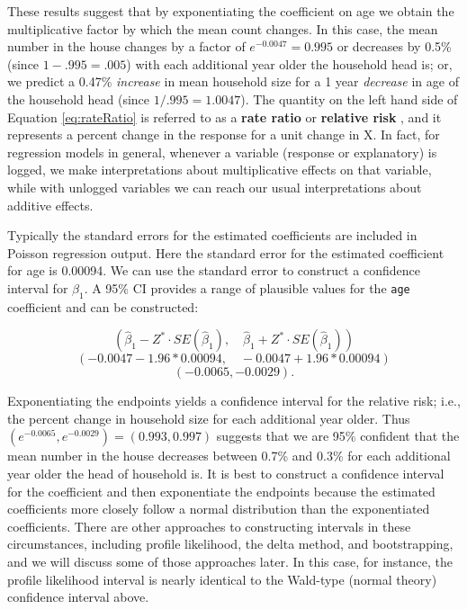 \documentclass[
]{krantz}
\begin{document}
These results suggest that by exponentiating the coefficient on age we obtain the multiplicative factor by which the mean count changes. In this case, the mean number in the house changes by a factor of \(e^{-0.0047}=0.995\) or decreases by 0.5\% (since \(1-.995 = .005\)) with each additional year older the household head is; or, we predict a 0.47\% \emph{increase} in mean household size for a 1 year \emph{decrease} in age of the household head (since \(1/.995=1.0047\)). The quantity on the left hand side of Equation \eqref{eq:rateRatio} is referred to as a \textbf{rate ratio} or \textbf{relative risk} , and it represents a percent change in the response for a unit change in X. In fact, for regression models in general, whenever a variable (response or explanatory) is logged, we make interpretations about multiplicative effects on that variable, while with unlogged variables we can reach our usual interpretations about additive effects.

Typically the standard errors for the estimated coefficients are included in Poisson regression output. Here the standard error for the estimated coefficient for age is 0.00094. We can use the standard error to construct a confidence interval for \(\beta_1\). A 95\% CI provides a range of plausible values for the \texttt{age} coefficient and can be constructed:

\[(\hat\beta_1-Z^*\cdot SE(\hat\beta_1), \quad \hat\beta_1+Z^*\cdot SE(\hat\beta_1))\]
\[(-0.0047-1.96*0.00094, \quad -0.0047+1.96*0.00094)\]
\[ (-0.0065, -0.0029).
 \]

Exponentiating the endpoints yields a confidence interval for the relative risk; i.e., the percent change in household size for each additional year older. Thus \((e^{-0.0065},e^{-0.0029})=(0.993,0.997)\) suggests that we are 95\% confident that the mean number in the house decreases between 0.7\% and 0.3\% for each additional year older the head of household is. It is best to construct a confidence interval for the coefficient and then exponentiate the endpoints because the estimated coefficients more closely follow a normal distribution than the exponentiated coefficients. There are other approaches to constructing intervals in these circumstances, including profile likelihood, the delta method, and bootstrapping, and we will discuss some of those approaches later. In this case, for instance, the profile likelihood interval is nearly identical to the Wald-type (normal theory) confidence interval  above.
\end{document}
